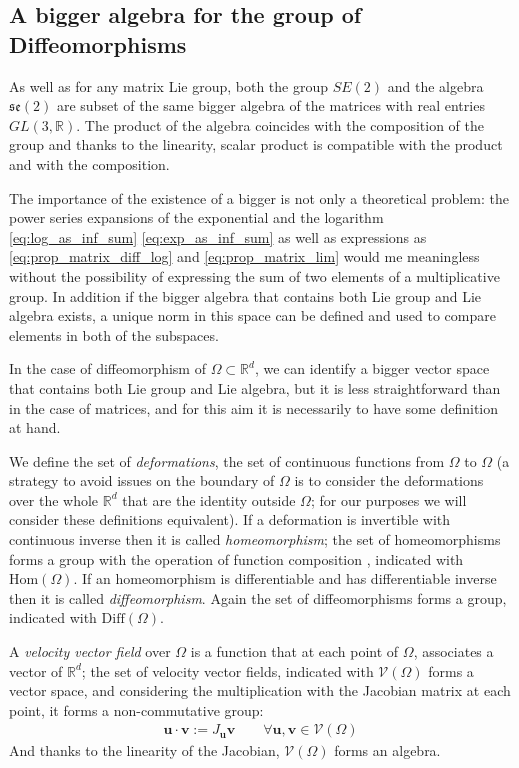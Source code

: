 \subsection{A bigger algebra for the group of Diffeomorphisms}
As well as for any matrix Lie group, both the group $SE(2)$ and the algebra $\mathfrak{se}(2)$ are subset of the same bigger algebra of the matrices with real entries $GL(3,\mathbb{R})$. The product of the algebra coincides with the composition of the group and thanks to the linearity, scalar product is compatible with the product and with the composition.

The importance of the existence of a bigger is not only a theoretical problem: the power series expansions of the exponential and the logarithm \ref{eq:log_as_inf_sum} \ref{eq:exp_as_inf_sum} as well as expressions as \ref{eq:prop_matrix_diff_log} and \ref{eq:prop_matrix_lim} would me meaningless without the possibility of expressing the sum of two elements of a multiplicative group. In addition if the bigger algebra that contains both Lie group and Lie algebra exists, a unique norm in this space can be defined and used to compare elements in both of the subspaces.

In the case of diffeomorphism of $\Omega\subset \mathbb{R}^d$, we can identify a bigger vector space that contains both Lie group and Lie algebra, but it is less straightforward than in the case of matrices, and for this aim it is necessarily to have some definition at hand.

We define the set of \emph{deformations}, the set of continuous functions from $\Omega$ to $\Omega$ (a strategy to avoid issues on the boundary of $\Omega$ is to consider the deformations over the whole $\mathbb{R}^d$ that are the identity outside $\Omega$; for our purposes we will consider these definitions equivalent). If a deformation is invertible with continuous inverse then it is called \emph{homeomorphism}; the set of homeomorphisms forms a group with the operation of function composition , indicated with $\text{Hom}(\Omega)$. If an homeomorphism is differentiable and has differentiable inverse then it is called \emph{diffeomorphism}. Again the set of diffeomorphisms forms a group, indicated with $\text{Diff}(\Omega)$.

A \emph{velocity vector field} over $\Omega$ is a function that at each point of $\Omega$, associates a vector of $\mathbb{R}^d$; the set of velocity vector fields, indicated with $\mathcal{V}(\Omega)$ forms a vector space, and considering the multiplication with the Jacobian matrix at each point, it forms a non-commutative group:  
\begin{align*}
\mathbf{u}\cdot \mathbf{v} := J_{\mathbf{u}}\mathbf{v}
\qquad
\forall\mathbf{u},\mathbf{v}\in \mathcal{V}(\Omega)
\end{align*}
And thanks to the linearity of the Jacobian, $\mathcal{V}(\Omega)$ forms an algebra.

